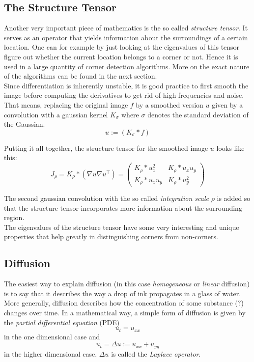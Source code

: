 \subsection*{The Structure Tensor}
Another very important piece of mathematics is the so called \textit{structure tensor}. It serves as an
operator that yields information about the surroundings of a certain location. One can for example
by just looking at the eigenvalues of this tensor figure out whether the current location belongs
to a corner or not. Hence it is used in a large quantity of corner detection algorithms. More on
the exact nature of the algorithms can be found in the next section.\\
Since differentiation is inherently unstable, it is good practice to first smooth the image before
computing the derivatives to get rid of high frequencies and noise. That means, replacing the
original image $f$ by a smoothed version $u$ given by a convolution with a gaussian kernel $K_\sigma$
where $\sigma$ denotes the standard deviation of the Gaussian.
\begin{equation}
    u := (K_\sigma * f)
\end{equation}

Putting it all together, the structure tensor for the smoothed image $u$ looks like this:
\begin{equation}
    J_\rho = K_\rho * \left(\nabla u \nabla u^\top\right)= \begin{pmatrix}
        K_\rho * u_x^2 & K_\rho * u_xu_y \\
        K_\rho * u_xu_y & K_\rho * u_y^2
    \end{pmatrix} 
\end{equation}

The second gaussian convolution with the so called \textit{integration scale} $\rho$ is added so
that the structure tensor incorporates more information about the surrounding region. \\
The eigenvalues of the structure tensor have some very interesting and unique properties that help
greatly in distinguishing corners from non-corners.
\subsection*{Diffusion}

The easiest way to explain diffusion (in this case \textit{homogeneous} or \textit{linear} 
diffusion) is to say that it describes the way a drop of ink propagates in a glass of water. 
More generally, diffusion describes how the concentration of some substance (?) changes over time.
In a mathematical way, a simple form of diffusion is given by the \textit{partial differential
equation} (PDE)
\begin{equation}\label{eq:LinDiff}
    u_t = u_{xx}
\end{equation}
in the one dimensional case and 
\begin{equation}\label{eq:2dDiff}
    u_t =  \Delta u := u_{xx} + u_{yy}
\end{equation}
in the higher dimensional case. $\Delta u$ is called the \textit{Laplace operator}.

